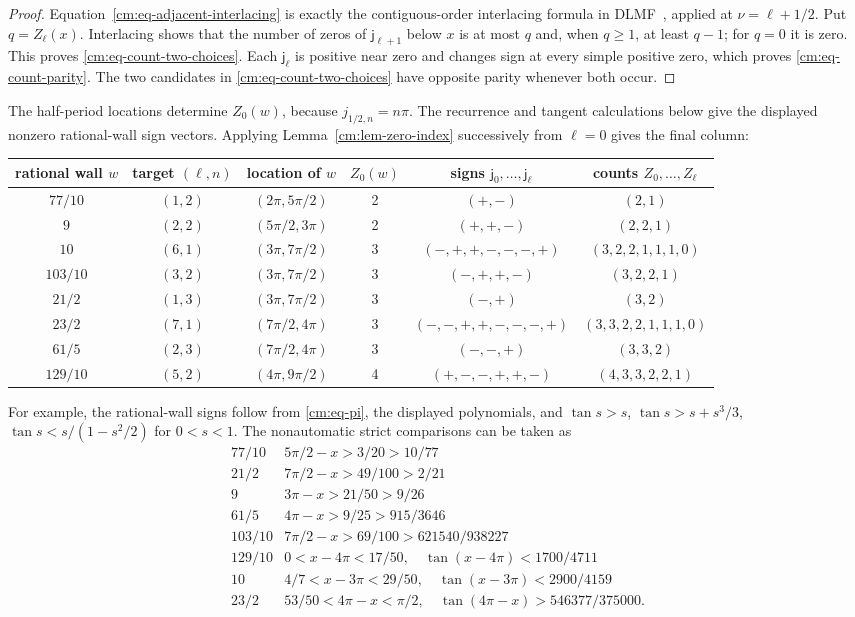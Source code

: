 \documentclass[11pt]{article}
\numberwithin{equation}{section}
\theoremstyle{definition}
\theoremstyle{remark}
\begin{document}
\begin{proof}
Equation~\eqref{cm:eq-adjacent-interlacing} is exactly the contiguous-order
interlacing formula in DLMF~\cite[Eq.~(10.21.2)]{DLMF}, applied at
\(\nu=\ell+1/2\).  Put \(q=Z_\ell(x)\).  Interlacing shows that the number
of zeros of \(\mathsf j_{\ell+1}\) below \(x\) is at most \(q\) and, when
\(q\geq1\), at least \(q-1\); for \(q=0\) it is zero.  This proves
\eqref{cm:eq-count-two-choices}.  Each \(\mathsf j_\ell\) is positive near
zero and changes sign at every simple positive zero, which proves
\eqref{cm:eq-count-parity}.  The two candidates in
\eqref{cm:eq-count-two-choices} have opposite parity whenever both occur.
\end{proof}

The half-period locations determine \(Z_0(w)\), because
\(j_{1/2,n}=n\pi\).  The recurrence and tangent calculations below give
the displayed nonzero rational-wall sign vectors.  Applying
Lemma~\ref{cm:lem-zero-index} successively from \(\ell=0\) gives the final
column:
\begin{center}
\scriptsize
\renewcommand{\arraystretch}{1.16}
\begin{tabular}{c|c|c|c|c|c}
rational wall \(w\)&target \((\ell,n)\)&location of \(w\)&\(Z_0(w)\)&
signs \(\mathsf j_0,\ldots,\mathsf j_\ell\)&
counts \(Z_0,\ldots,Z_\ell\)\\ \hline
\(77/10\)&\((1,2)\)&\((2\pi,5\pi/2)\)&2&\((+,-)\)&\((2,1)\)\\
\(9\)&\((2,2)\)&\((5\pi/2,3\pi)\)&2&\((+,+,-)\)&\((2,2,1)\)\\
\(10\)&\((6,1)\)&\((3\pi,7\pi/2)\)&3&
\((-,+,+,-,-,-,+)\)&\((3,2,2,1,1,1,0)\)\\
\(103/10\)&\((3,2)\)&\((3\pi,7\pi/2)\)&3&
\((-,+,+,-)\)&\((3,2,2,1)\)\\
\(21/2\)&\((1,3)\)&\((3\pi,7\pi/2)\)&3&\((-,+)\)&\((3,2)\)\\
\(23/2\)&\((7,1)\)&\((7\pi/2,4\pi)\)&3&
\((-,-,+,+,-,-,-,+)\)&\((3,3,2,2,1,1,1,0)\)\\
\(61/5\)&\((2,3)\)&\((7\pi/2,4\pi)\)&3&
\((-,-,+)\)&\((3,3,2)\)\\
\(129/10\)&\((5,2)\)&\((4\pi,9\pi/2)\)&4&
\((+,-,-,+,+,-)\)&\((4,3,3,2,2,1)\)
\end{tabular}
\end{center}
For example, the rational-wall signs follow from \eqref{cm:eq-pi}, the displayed
polynomials, and
\(\tan s>s\), \(\tan s>s+s^3/3\),
\(\tan s<s/(1-s^2/2)\) for \(0<s<1\).  The nonautomatic strict
comparisons can be taken as
\[
\begin{array}{c|c}
77/10&5\pi/2-x>3/20>10/77\\
21/2&7\pi/2-x>49/100>2/21\\
9&3\pi-x>21/50>9/26\\
61/5&4\pi-x>9/25>915/3646\\
103/10&7\pi/2-x>69/100>621540/938227\\
129/10&0<x-4\pi<17/50,\quad\tan(x-4\pi)<1700/4711\\
10&4/7<x-3\pi<29/50,\quad\tan(x-3\pi)<2900/4159\\
23/2&53/50<4\pi-x<\pi/2,\quad
\tan(4\pi-x)>546377/375000.
\end{array}
\]
\end{document}
